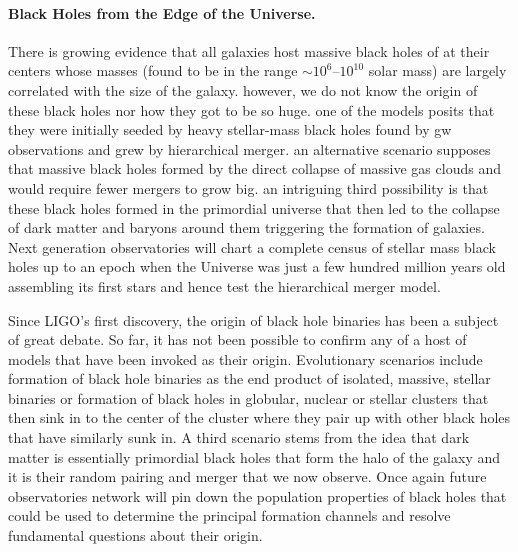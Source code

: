 \documentclass[twocolumn,aps,prd,nofootinbib,superscriptaddress,10pt,notitlepage,preprintnumbers] {revtex4-1}
\begin{document}
\noindent \paragraph{Black Holes from the Edge of the Universe.}
There is growing evidence that all galaxies host massive black holes of 
at their centers whose masses (found to be in the range $\sim 10^6$--$10^{10}$ solar mass) are largely correlated with the size of the galaxy. however, we do not know the origin of these black holes nor how they got to be so huge. one of the models posits that they were initially seeded by heavy stellar-mass black holes found by gw observations and grew by hierarchical merger. an alternative scenario supposes that massive black holes formed by the direct collapse of massive gas clouds and would require fewer mergers to grow big. an intriguing third possibility is that these black holes formed in the primordial universe that then led to the collapse of dark matter and baryons around them triggering the formation of galaxies.   Next generation observatories will chart a complete census of stellar mass black holes up to an epoch when the Universe was just a few hundred million years old assembling its first stars and hence test the hierarchical merger model.

Since LIGO's first discovery, the origin of black hole binaries has been a subject of great debate. So far, it has not been possible to confirm any of a host of models that have been invoked as their origin.  Evolutionary scenarios include formation of black hole binaries as the end product of isolated, massive, stellar binaries or formation of black holes in globular, nuclear or stellar clusters that then sink in to the center of the cluster where they pair up with other black holes that have similarly sunk in.  A third scenario stems from the idea that dark matter is essentially primordial black holes that form the halo of the galaxy and it is their random pairing and merger that we now observe. Once again future observatories network will pin down the population properties of black holes that could be used to determine the principal formation channels and resolve fundamental questions about their origin. 
\end{document}
